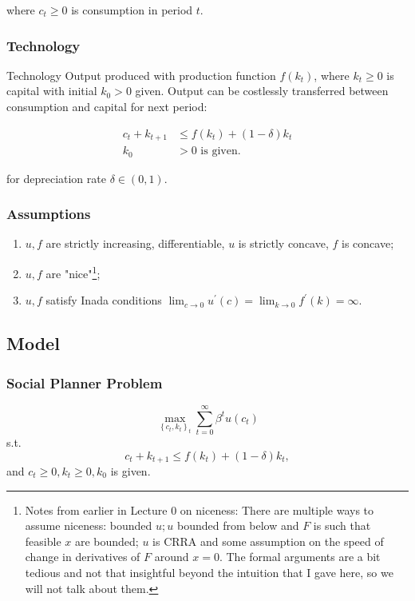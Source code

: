 \documentclass[10pt]{article}
\begin{document}
where $c_t \geq 0$ is consumption in period $t$.

\subsubsection{Technology}

Technology
Output produced with production function $f\left(k_t\right)$, where $k_t \geq 0$ is capital with initial $k_0>0$ given. Output can be costlessly transferred between consumption and capital for next period:

$$
    \begin{aligned}
    c_t+k_{t+1} & \leq f\left(k_t\right)+(1-\delta) k_t \\
    k_0 & >0 \text { is given. }
    \end{aligned}
$$

for depreciation rate $\delta \in(0,1)$.

\subsubsection{Assumptions}

\begin{enumerate}
    \item $u, f$ are strictly increasing, differentiable, $u$ is strictly concave, $f$ is concave;
    \item $u, f$ are "nice"\footnote{Notes from earlier in Lecture 0 on niceness: There are multiple ways to assume niceness: bounded $u ; u$ bounded from below and $F$ is such that feasible $x$ are bounded; $u$ is CRRA and some assumption on the speed of change in derivatives of $F$ around $x=0$. The formal arguments are a bit tedious and not that insightful beyond the intuition that I gave here, so we will not talk about them.};
    \item $u, f$ satisfy Inada conditions $\lim _{c \rightarrow 0} u^{\prime}(c)=\lim _{k \rightarrow 0} f^{\prime}(k)=\infty$.
\end{enumerate}

\subsection{Model}

\subsubsection{Social Planner Problem}

$$
\max _{\left\{c_t, k_t\right\}_t} \sum_{t=0}^{\infty} \beta^t u\left(c_t\right)
$$
s.t.
$$
c_t+k_{t+1} \leq f\left(k_t\right)+(1-\delta) k_t,
$$
and $c_t \geq 0, k_t \geq 0, k_0$ is given.
\end{document}
